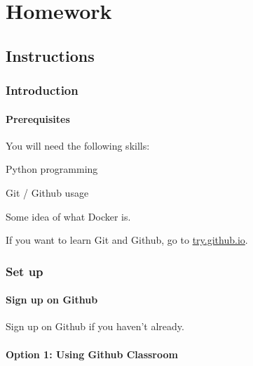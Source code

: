 \part{Homework}

\instructors{
  
}


\chapter{Instructions}


\section{Introduction}

\subsection{Prerequisites}

You will need the following skills:

\begin{compactitem}
  \item Python programming
  \item Git / Github usage
  \item Some idea of what Docker is.
\end{compactitem}


If you want to learn Git and Github, go to \href{https://try.github.io/}{try.github.io}.



\section{Set up}

\subsection{Sign up on Github}

Sign up on Github if you haven't already.

\subsection{Option 1: Using Github Classroom}\label{subsec:with-classroom}

